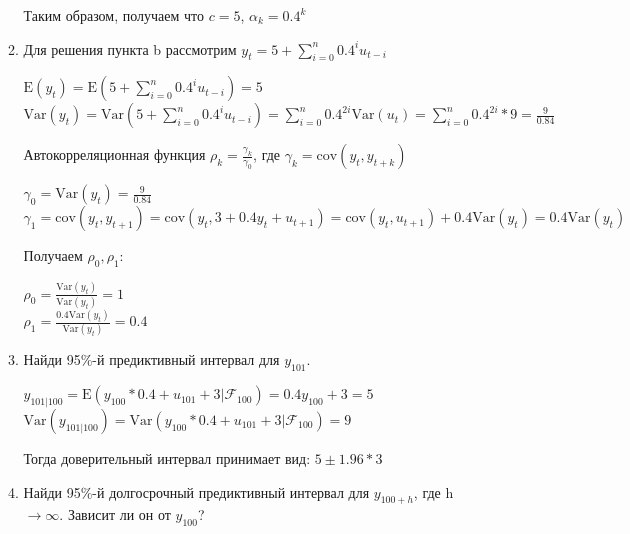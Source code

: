 \documentclass[a4paper,14pt]{article}
\begin{document}
\begin{enumerate}
\begin{enumerate}
\begin{center}
\begin{spacing}{1.5}
	\end{spacing}
	
\end{center}
Таким образом, получаем что $c = 5$, $\alpha_k = 0.4^k$
	\item Для решения пункта b рассмотрим $y_t = 5 + \sum_{i=0}^n 0.4^iu_{t-i}$

\begin{center}
	
	\begin{spacing}{1.5}
		$\text{E}(y_t) = \text{E}(5+\sum_{i=0}^n 0.4^iu_{t-i}) = 5$\\
		$\text{Var}(y_t) = \text{Var}(5+\sum_{i=0}^n 0.4^iu_{t-i}) = \sum_{i=0}^n 0.4^{2i}\text{Var}(u_t) = \sum_{i=0}^n 0.4^{2i}*9 = \frac{9}{0.84}$
	\end{spacing}
\end{center}
Автокорреляционная функция $\rho_k = \frac{\gamma_k}{\gamma_0}$, где $\gamma_k = \text{cov}(y_t,y_{t+k})$
\begin{center}
	
	\begin{spacing}{1.5}	
	$\gamma_0 = \text{Var}(y_t) = \frac{9}{0.84}$\\
	$\gamma_1 = \text{cov}(y_t,y_{t+1}) = \text{cov}(y_t, 3 + 0.4y_t+u_{t+1})=\text{cov}(y_t,u_{t+1}) + 0.4\text{Var}(y_t)= 0.4\text{Var}(y_t)$\\
	\end{spacing}
\end{center}
Получаем $\rho_0,\rho_1$:
\begin{center}
	
	\begin{spacing}{1.5}	
		$\rho_0 = \frac{\text{Var}(y_t)}{\text{Var}(y_t)} = 1$\\
		$\rho_1 = \frac{0.4\text{Var}(y_t)}{\text{Var}(y_t)} = 0.4$
	\end{spacing}
\end{center}
	\item Найди 95\%-й предиктивный интервал для $y_{101}$.
\begin{center}

	\begin{spacing}{1.5}
		$y_{101|100} = \text{E}(y_{100}*0.4+u_{101}+3 | \mathcal{F}_{100}) = 0.4y_{100}+3 = 5$\\
		$\text{Var}(y_{101|100}) = \text{Var}(y_{100}*0.4+u_{101}+3|\mathcal{F}_{100}) = 9$
	\end{spacing}
\end{center}
Тогда доверительный интервал принимает вид: $5 \pm 1.96*3$
\item Найди 95\%-й долгосрочный предиктивный интервал для $y_{100+h}$, где h $\rightarrow \infty$. Зависит ли он от $y_{100}$?


\end{enumerate}
\end{enumerate}
\end{document}
